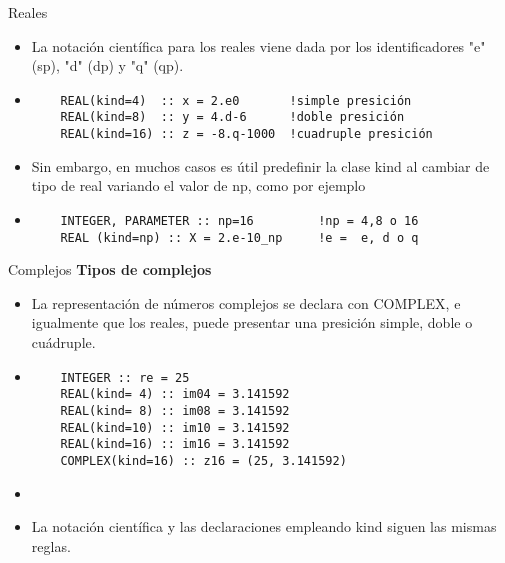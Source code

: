 \begin{frame}[fragile]{Reales}
 \begin{itemize}[<+(0)->]
  \item La notación científica para los reales viene dada por los identificadores "e" (sp), "d" (dp) y "q" (qp).  
  \item []
   \begin{verbatim}
    REAL(kind=4)  :: x = 2.e0       !simple presición
    REAL(kind=8)  :: y = 4.d-6      !doble presición
    REAL(kind=16) :: z = -8.q-1000  !cuadruple presición
   \end{verbatim}
  \item Sin embargo, en muchos casos es útil predefinir la clase kind al cambiar de tipo de real variando el valor de np, como por ejemplo 
  \item []
   \begin{verbatim}
    INTEGER, PARAMETER :: np=16         !np = 4,8 o 16
    REAL (kind=np) :: X = 2.e-10_np     !e =  e, d o q
   \end{verbatim}
 \end{itemize}
\end{frame}


\begin{frame}[fragile]{Complejos}
\textbf{Tipos de complejos}
 \begin{itemize}[<+(1)->]
  \item La representación de números complejos se declara con COMPLEX, e igualmente que los reales, puede presentar una presición simple, doble o cuádruple.
  \item []
   \begin{verbatim}
    INTEGER :: re = 25
    REAL(kind= 4) :: im04 = 3.141592
    REAL(kind= 8) :: im08 = 3.141592
    REAL(kind=10) :: im10 = 3.141592
    REAL(kind=16) :: im16 = 3.141592
    COMPLEX(kind=16) :: z16 = (25, 3.141592)
   \end{verbatim}
  \item[] 
  \item La notación científica y las declaraciones empleando kind siguen las mismas reglas.
 \end{itemize}
\end{frame}